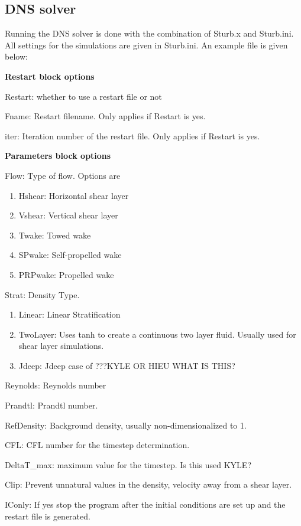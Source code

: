 \newcommand{\kkzero}{\ensuremath{\frac{k}{k_0}}}
\newcommand{\ddx}[2]{\frac{\partial #1}{\partial #2}}


\subsection{DNS solver}
Running the DNS solver is done with the combination of Sturb.x and Sturb.ini. 
All settings for the simulations are given in Sturb.ini. An example file is
given below:

\textbf{Restart block options}
\begin{description}
  \item Restart: whether to use a restart file or not
  \item Fname: Restart filename. Only applies if Restart is yes.
  \item iter: Iteration number of the restart file. Only applies if Restart is
 yes.
\end{description}

\textbf{Parameters block options}
\begin{description}
\item Flow: Type of flow. Options are
  \begin{enumerate}
    \item Hshear: Horizontal shear layer
    \item Vshear: Vertical shear layer
    \item Twake: Towed wake
    \item SPwake: Self-propelled wake
    \item PRPwake: Propelled wake
  \end{enumerate}
\item Strat: Density Type.
  \begin{enumerate}
    \item Linear: Linear Stratification
    \item TwoLayer: Uses tanh to create a continuous two layer fluid. Usually
                    used for shear layer simulations.
    \item Jdeep: Jdeep case of ???KYLE OR HIEU WHAT IS THIS?
  \end{enumerate}
\item Reynolds: Reynolds number 
\item Prandtl: Prandtl number.
\item RefDensity: Background density, usually non-dimensionalized to 1.
\item CFL: CFL number for the timestep determination.
\item DeltaT\_max: maximum value for the timestep. Is this used KYLE?
\item Clip: Prevent unnatural values in the density, velocity away from a shear
            layer.
\item IConly: If yes stop the program after the initial conditions are set up
              and the restart file is generated.
\end{description}

